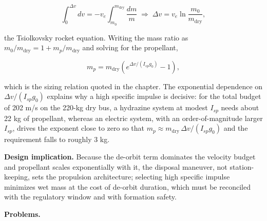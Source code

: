 \documentclass[
  11pt,
  openany,
  oneside]{book}
\begin{document}
\begin{equation}
\int_0^{\Delta v} dv = -v_e \int_{m_0}^{m_{\mathrm{dry}}} \frac{dm}{m} \;\Longrightarrow\; \Delta v = v_e \ln\!\frac{m_0}{m_{\mathrm{dry}}}, \tag{15.4}
\end{equation}

the Tsiolkovsky rocket equation. Writing the mass ratio as
\(m_0/m_{\mathrm{dry}} = 1 + m_p/m_{\mathrm{dry}}\) and solving for the
propellant,

\begin{equation}
m_p = m_{\mathrm{dry}}\left(e^{\Delta v/(I_{sp} g_0)} - 1\right), \tag{15.5}
\end{equation}

which is the sizing relation quoted in the chapter. The exponential
dependence on \(\Delta v/(I_{sp} g_0)\) explains why a high specific
impulse is decisive: for the total budget of 202 m/s on the 220-kg dry
bus, a hydrazine system at modest \(I_{sp}\) needs about 22 kg of
propellant, whereas an electric system, with an order-of-magnitude
larger \(I_{sp}\), drives the exponent close to zero so that
\(m_p \approx m_{\mathrm{dry}}\,\Delta v/(I_{sp} g_0)\) and the
requirement falls to roughly 3 kg.

\textbf{Design implication.} Because the de-orbit term dominates the
velocity budget and propellant scales exponentially with it, the
disposal maneuver, not station-keeping, sets the propulsion
architecture; selecting high specific impulse minimizes wet mass at the
cost of de-orbit duration, which must be reconciled with the regulatory
window and with formation safety.

\textbf{Problems.}
\end{document}
